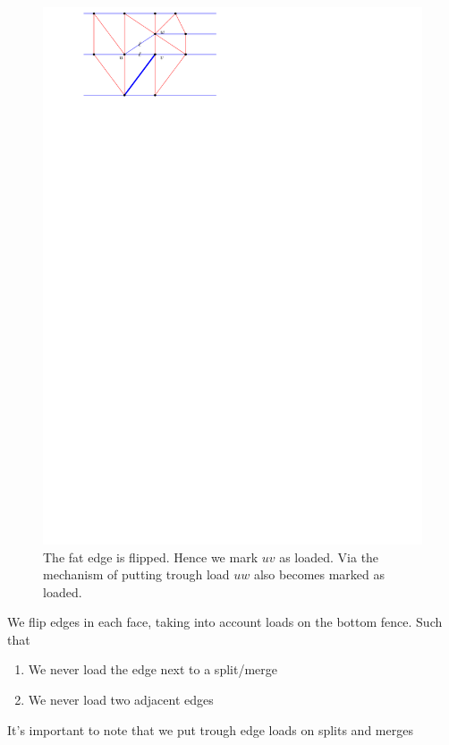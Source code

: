 \begin{figure}[h]
  \centering
  \includegraphics[scale=1]{blueFaceSubdivision/img/puttingTroughLoad.pdf}
  \caption{The fat edge is flipped. Hence we mark $uv$ as loaded. Via the mechanism of putting trough load $uw$ also becomes marked as loaded.}
  \label{fig:subdiv:putTrougLoad}
\end{figure}


We flip edges in each face, taking into account loads on the bottom fence. Such that

\begin{enumerate}
  \item We never load the edge next to a split/merge
  \item We never load two adjacent edges
\end{enumerate}

It's important to note that we put trough edge loads on splits and merges

